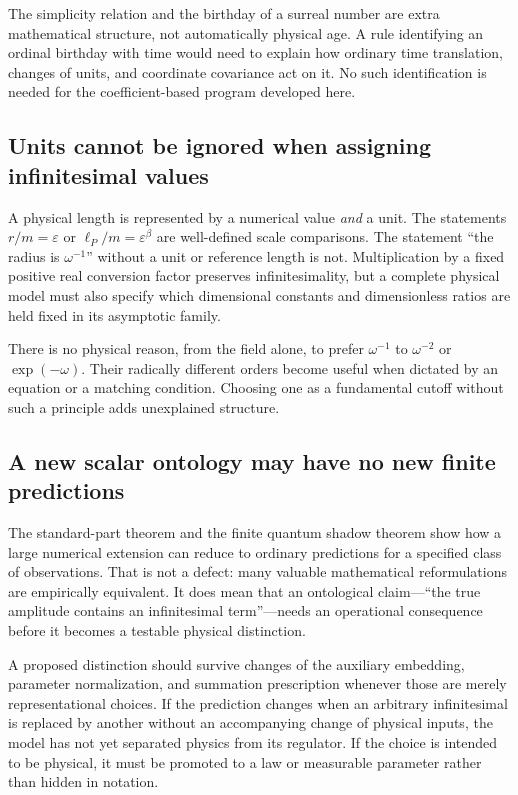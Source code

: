 \documentclass[11pt,a4paper]{article}
\numberwithin{equation}{section}
\theoremstyle{definition}
\theoremstyle{remark}
\begin{document}
The simplicity relation and the birthday of a surreal number are extra
mathematical structure, not automatically physical age. A rule identifying an
ordinal birthday with time would need to explain how ordinary time translation,
changes of units, and coordinate covariance act on it. No such identification
is needed for the coefficient-based program developed here.

\subsection{Units cannot be ignored when assigning infinitesimal values}
A physical length is represented by a numerical value \emph{and} a unit. The
statements $r/m=\varepsilon$ or $\ell_P/m=\varepsilon^\beta$ are
well-defined scale comparisons. The statement ``the radius is $\omega^{-1}$''
without a unit or reference length is not. Multiplication by a fixed positive
real conversion factor preserves infinitesimality, but a complete physical
model must also specify which dimensional constants and dimensionless ratios
are held fixed in its asymptotic family.

There is no physical reason, from the field alone, to prefer $\omega^{-1}$ to
$\omega^{-2}$ or $\exp(-\omega)$. Their radically different orders become
useful when dictated by an equation or a matching condition. Choosing one as a
fundamental cutoff without such a principle adds unexplained structure.

\subsection{A new scalar ontology may have no new finite predictions}
The standard-part theorem and the finite quantum shadow theorem show how a
large numerical extension can reduce to ordinary predictions for a specified
class of observations. That is not a defect: many valuable mathematical
reformulations are empirically equivalent. It does mean that an ontological
claim---``the true amplitude contains an infinitesimal term''---needs an
operational consequence before it becomes a testable physical distinction.

A proposed distinction should survive changes of the auxiliary embedding,
parameter normalization, and summation prescription whenever those are merely
representational choices. If the prediction changes when an arbitrary
infinitesimal is replaced by another without an accompanying change of
physical inputs, the model has not yet separated physics from its regulator.
If the choice is intended to be physical, it must be promoted to a law or
measurable parameter rather than hidden in notation.
\end{document}
